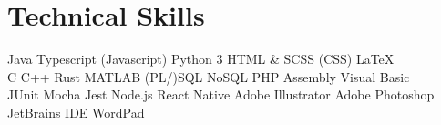 \documentclass[]{deedy-resume-openfont}
\begin{document}
\section{Technical Skills}
Java \textbullet{} Typescript (Javascript) \textbullet{} Python 3 \textbullet{} HTML \& SCSS (CSS) \textbullet{} \LaTeX\\ 
C \textbullet{} C++ \textbullet{} Rust \textbullet{} MATLAB \textbullet{} (PL/)SQL \textbullet{} NoSQL \textbullet{} PHP \textbullet{} Assembly \textbullet{} Visual Basic\\
JUnit \textbullet{} Mocha \textbullet{} Jest \textbullet{} Node.js \textbullet{} React Native \textbullet{} Adobe Illustrator \textbullet{} Adobe Photoshop \textbullet{} JetBrains IDE \textbullet{} WordPad
\sectionsep
\end{document}
